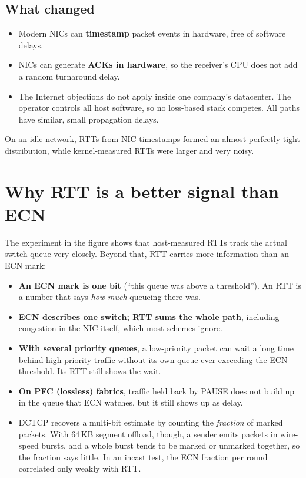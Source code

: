 \subsection{What changed}
\begin{itemize}
  \item Modern NICs can \textbf{timestamp} packet events in hardware, free of software delays.
  \item NICs can generate \textbf{ACKs in hardware}, so the receiver's CPU does not add a random turnaround delay.
  \item The Internet objections do not apply inside one company's datacenter. The operator controls all host software, so no loss-based
        stack competes. All paths have similar, small propagation delays.
\end{itemize}
On an idle network, RTTs from NIC timestamps formed an almost perfectly tight distribution, while kernel-measured RTTs were larger and very
noisy.

\section{Why RTT is a better signal than ECN}


The experiment in the figure shows that host-measured RTTs track the actual switch queue very closely. Beyond that, RTT carries more information than an ECN mark:
\begin{itemize}
  \item \textbf{An ECN mark is one bit} (``this queue was above a threshold''). An RTT is a number that says \emph{how much} queueing there was.
  \item \textbf{ECN describes one switch; RTT sums the whole path}, including congestion in the NIC itself, which most schemes ignore.
  \item \textbf{With several priority queues}, a low-priority packet can wait a long time behind high-priority traffic without its own queue
        ever exceeding the ECN threshold. Its RTT still shows the wait.
  \item \textbf{On PFC (lossless) fabrics}, traffic held back by PAUSE does not build up in the queue that ECN watches, but it still shows up as delay.
  \item DCTCP recovers a multi-bit estimate by counting the \emph{fraction} of marked packets. With 64\,KB segment offload, though, a sender emits
        packets in wire-speed bursts, and a whole burst tends to be marked or unmarked together, so the fraction says little. In an incast test,
        the ECN fraction per round correlated only weakly with RTT.
\end{itemize}

